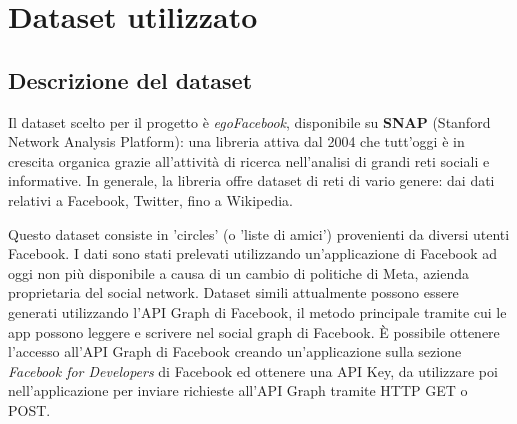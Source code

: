 

\section{Dataset utilizzato}

\subsection{Descrizione del dataset}
Il dataset scelto per il progetto è \textit{egoFacebook}, disponibile su \textbf{SNAP} (Stanford Network Analysis Platform): una libreria attiva dal 2004 che tutt’oggi è in crescita organica grazie all’attività di ricerca nell’analisi di grandi reti sociali e informative. In generale, la libreria offre dataset di reti di vario genere: dai dati relativi a Facebook, Twitter, fino a Wikipedia.

Questo dataset consiste in 'circles' (o 'liste di amici') provenienti da diversi utenti Facebook. I dati sono stati prelevati utilizzando un'applicazione di Facebook ad oggi non più disponibile a causa di un cambio di politiche di Meta, azienda proprietaria del social network. Dataset simili attualmente possono essere generati utilizzando l'API Graph di Facebook, il metodo principale tramite cui le app possono leggere e scrivere nel social graph di Facebook. È possibile ottenere l'accesso all'API Graph di Facebook creando un'applicazione sulla sezione \textit{Facebook for Developers} di Facebook ed ottenere una API Key, da utilizzare poi nell'applicazione per inviare richieste all'API Graph tramite HTTP GET o POST.


